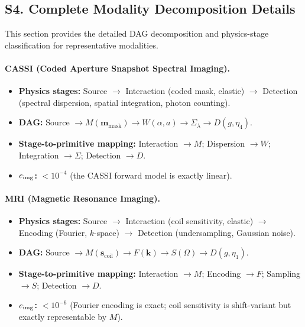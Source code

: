 \subsection*{S4. Complete Modality Decomposition Details}
\label{sec:supp_modalities}

This section provides the detailed DAG decomposition and physics-stage classification for representative modalities.

\paragraph{CASSI (Coded Aperture Snapshot Spectral Imaging).}
\begin{itemize}
  \item \textbf{Physics stages:} Source $\to$ Interaction (coded mask, elastic) $\to$ Detection (spectral dispersion, spatial integration, photon counting).
  \item \textbf{DAG:} Source $\to M(\mathbf{m}_{\mathrm{mask}}) \to W(\alpha, a) \to \Sigma_\lambda \to D(g, \eta_4)$.
  \item \textbf{Stage-to-primitive mapping:} Interaction $\to M$; Dispersion $\to W$; Integration $\to \Sigma$; Detection $\to D$.
  \item \textbf{$e_{\mathrm{img}}$:} $< 10^{-4}$ (the CASSI forward model is exactly linear).
\end{itemize}

\paragraph{MRI (Magnetic Resonance Imaging).}
\begin{itemize}
  \item \textbf{Physics stages:} Source $\to$ Interaction (coil sensitivity, elastic) $\to$ Encoding (Fourier, $k$-space) $\to$ Detection (undersampling, Gaussian noise).
  \item \textbf{DAG:} Source $\to M(\mathbf{s}_{\mathrm{coil}}) \to F(\mathbf{k}) \to S(\Omega) \to D(g, \eta_1)$.
  \item \textbf{Stage-to-primitive mapping:} Interaction $\to M$; Encoding $\to F$; Sampling $\to S$; Detection $\to D$.
  \item \textbf{$e_{\mathrm{img}}$:} $< 10^{-6}$ (Fourier encoding is exact; coil sensitivity is shift-variant but exactly representable by $M$).
\end{itemize}

